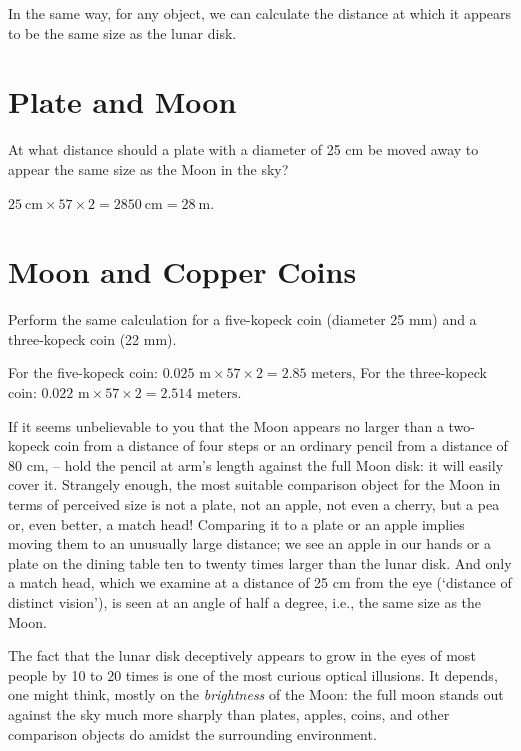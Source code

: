 In the same way, for any object, we can calculate the distance at which it appears to be the same size as the lunar disk.

\section{Plate and Moon} 
\label{sec-3.3}

\ques At what distance should a plate with a diameter of 25 cm be moved away to appear the same size as the Moon in the sky?

\ans $\SI{25}{\centi\meter} \times 57 \times 2 = \SI{2850}{\centi\meter} = \SI{28}{\meter}$.

\clearpage 

\section{Moon and Copper Coins} 
\label{sec-3.4}

\ques Perform the same calculation for a five-kopeck coin (diameter 25 mm) and a three-kopeck coin (22 mm).

\ans For the five-kopeck coin: \(0.025 \text{ m} \times 57 \times 2 = 2.85 \text{ meters}\),
For the three-kopeck coin: \(0.022 \text{ m} \times 57 \times 2 = 2.514 \text{ meters}\).

If it seems unbelievable to you that the Moon appears no larger than a two-kopeck coin from a distance of four steps or an ordinary pencil from a distance of 80 cm, -- hold the pencil at arm's length against the full Moon disk: it will easily cover it. Strangely enough, the most suitable comparison object for the Moon in terms of perceived size is not a plate, not an apple, not even a cherry, but a pea or, even better, a match head! Comparing it to a plate or an apple implies moving them to an unusually large distance; we see an apple in our hands or a plate on the dining table ten to twenty times larger than the lunar disk. And only a match head, which we examine at a distance of 25 cm from the eye (`distance of distinct vision'), is seen at an angle of half a degree, i.e., the same size as the Moon.

The fact that the lunar disk deceptively appears to grow in the eyes of most people by 10 to 20 times is one of the most curious optical illusions. It depends, one might think, mostly on the \emph{brightness} of the Moon: the full moon stands out against the sky much more sharply than plates, apples, coins, and other comparison objects do amidst the surrounding environment.

